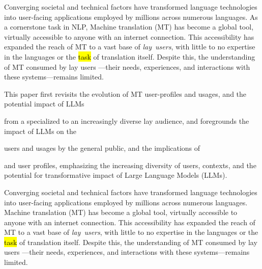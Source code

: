 Converging societal and technical factors
have transformed language technologies into user-facing applications employed by millions across numerous languages. 
As a cornerstone task in NLP, 
Machine translation (MT) has become a global tool, virtually accessible to anyone with an internet connection.
This accessibility has expanded the reach of MT to a vast base of \textit{lay~users},  with little to no expertise in the languages or the \hl{task} of translation itself. Despite this,
the understanding of MT consumed by lay users%
---their needs, experiences, and interactions with these systems---remains limited. 


This paper first revisits the evolution of MT user-profiles and usages, and the potential impact of LLMs 

from a specialized to an increasingly diverse lay audience, 
and foregrounds the impact of LLMs on the 

users and usages by the general public, and the implications of 

and user profiles, emphasizing the increasing diversity of users, contexts, and the potential for transformative impact of Large Language Models (LLMs).



Converging societal and technical factors
have transformed language technologies into user-facing applications employed by millions across numerous languages. 
Machine translation (MT) has become a global tool, virtually accessible to anyone with an internet connection.
This accessibility has expanded the reach of MT to a vast base of \textit{lay~users},  with little to no expertise in the languages or the \hl{task} of translation itself. Despite this,
the understanding of MT consumed by lay users%
---their needs, experiences, and interactions with these systems---remains limited. 

